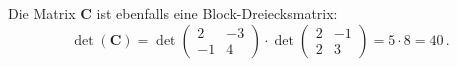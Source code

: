 {Die Matrix $\boldsymbol C$ ist ebenfalls eine Block-Dreiecksmatrix:
$$\det(\boldsymbol C) = \det \begin{pmatrix} 2 & -3 \\ -1 & 4 \end{pmatrix} \cdot
\det \begin{pmatrix} 2 & -1 \\ 2 & 3 \end{pmatrix} = 5 \cdot 8 = 40\,.$$


}
